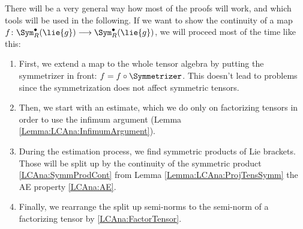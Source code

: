 There will be a very general way how most of the proofs will work, and which 
tools will be used in the following. If we want to show the continuity of a 
map $f \colon \Sym_R^{\bullet}(\lie{g}) \longrightarrow 
\Sym_R^{\bullet}(\lie{g})$, we will proceed most of the time like this:
\begin{enumerate}
	\item \label{Item:LCAna:Step1}
	First, we extend a map to the whole tensor algebra by putting the 
	symmetrizer in front: $f = f \circ \Symmetrizer$. This doesn't lead 
	to problems since the symmetrization does not affect symmetric tensors.

	\item \label{Item:LCAna:Step2}
	Then, we start with an estimate, which we do only on 
	factorizing tensors in order to use the infimum argument 
	(Lemma \ref{Lemma:LCAna:InfimumArgument}).

	\item \label{Item:LCAna:Step3}
	During the estimation process, we find symmetric products of Lie 
	brackets. Those will be split up by the continuity of the symmetric 
	product \eqref{LCAna:SymmProdCont} from Lemma 
	\ref{Lemma:LCAna:ProjTensSymm} the AE property \eqref{LCAna:AE}.
	
	\item \label{Item:LCAna:Step4}
	Finally, we rearrange the split up semi-norms to the semi-norm of a 
	factorizing tensor by \eqref{LCAna:FactorTensor}.
\end{enumerate}


